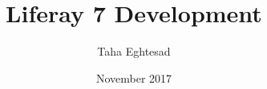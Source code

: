 \documentclass{article}
\title{Liferay 7 Development}
\author{Taha Eghtesad}
\date{November 2017}
\begin{document}
\sffamily

\maketitle

\tableofcontents







\end{document}
